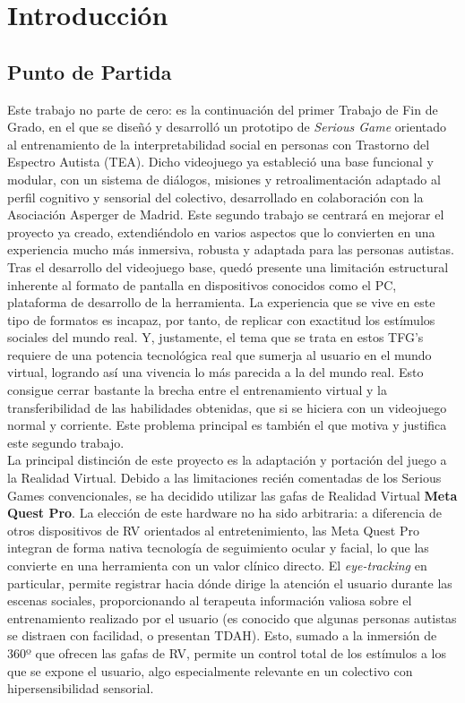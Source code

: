 \documentclass[12pt,twoside,titlepage]{report}
\begin{document}
\chapter{Introducción}

\section{Punto de Partida}

Este trabajo no parte de cero: es la continuación del primer Trabajo de Fin de Grado, en el que se diseñó y desarrolló un prototipo de \textit{Serious Game} orientado al entrenamiento de la interpretabilidad social en personas con Trastorno del Espectro Autista (TEA).
Dicho videojuego ya estableció una base funcional y modular, con un sistema de diálogos, misiones y retroalimentación adaptado al perfil cognitivo y sensorial del colectivo, desarrollado en colaboración con la Asociación Asperger de Madrid.
Este segundo trabajo se centrará en mejorar el proyecto ya creado, extendiéndolo en varios aspectos que lo convierten en una experiencia mucho más inmersiva, robusta y adaptada para las personas autistas.\\

Tras el desarrollo del videojuego base, quedó presente una limitación estructural inherente al formato de pantalla en dispositivos conocidos como el PC, plataforma de desarrollo de la herramienta.
La experiencia que se vive en este tipo de formatos es incapaz, por tanto, de replicar con exactitud los estímulos sociales del mundo real.
Y, justamente, el tema que se trata en estos TFG's requiere de una potencia tecnológica real que sumerja al usuario en el mundo virtual, logrando así una vivencia lo más parecida a la del mundo real.
Esto consigue cerrar bastante la brecha entre el entrenamiento virtual y la transferibilidad de las habilidades obtenidas, que si se hiciera con un videojuego normal y corriente.
Este problema principal es también el que motiva y justifica este segundo trabajo.\\

La principal distinción de este proyecto es la adaptación y portación del juego a la Realidad Virtual.
Debido a las limitaciones recién comentadas de los Serious Games convencionales, se ha decidido utilizar las gafas de Realidad Virtual \textbf{Meta Quest Pro}.
La elección de este hardware no ha sido arbitraria: a diferencia de otros dispositivos de RV orientados al entretenimiento, las Meta Quest Pro integran de forma nativa tecnología de seguimiento ocular y facial, lo que las convierte en una herramienta con un valor clínico directo.
El \textit{eye-tracking} en particular, permite registrar hacia dónde dirige la atención el usuario durante las escenas sociales, proporcionando al terapeuta información valiosa sobre el entrenamiento realizado por el usuario (es conocido que algunas personas autistas se distraen con facilidad, o presentan TDAH).
Esto, sumado a la inmersión de 360º que ofrecen las gafas de RV, permite un control total de los estímulos a los que se expone el usuario, algo especialmente relevante en un colectivo con hipersensibilidad sensorial.\\
\end{document}
